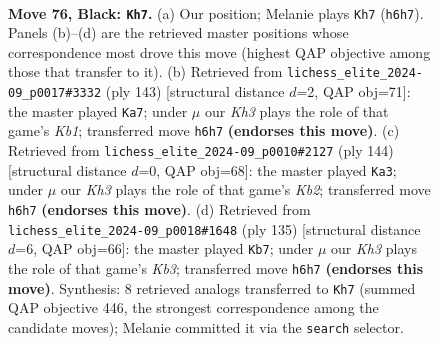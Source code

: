 \documentclass[11pt]{article}
\begin{document}
\clearpage

\begin{figure}[p]\centering
\begin{subfigure}{0.46\textwidth}\centering
\resizebox{\linewidth}{!}{%
\newchessgame
\chessboard[
  setfen={2r5/8/1R5k/8/5K2/8/3r3P/8 b - - 20 76},
  showmover=false,
  pgfstyle=straightmove, color=movearrow, markmove={h6-h7}
]}
\caption{}
\end{subfigure}\hfill
\begin{subfigure}{0.46\textwidth}\centering
\resizebox{\linewidth}{!}{%
\newchessgame
\chessboard[
  setfen={1k5R/8/3K4/P7/8/r7/8/8 b - - 12 72},
  showmover=false,
  pgfstyle=straightmove, color=movearrow, markmove={b8-a7}
]}
\caption{}
\end{subfigure}
\\[4pt]
\begin{subfigure}{0.46\textwidth}\centering
\resizebox{\linewidth}{!}{%
\newchessgame
\chessboard[
  setfen={8/5R2/6R1/8/3k2p1/8/1K5r/8 w - - 6 73},
  showmover=false,
  pgfstyle=straightmove, color=movearrow, markmove={b2-a3}
]}
\caption{}
\end{subfigure}\hfill
\begin{subfigure}{0.46\textwidth}\centering
\resizebox{\linewidth}{!}{%
\newchessgame
\chessboard[
  setfen={8/4K3/1k5R/3P4/8/8/8/2r5 b - - 1 68},
  showmover=false,
  pgfstyle=straightmove, color=movearrow, markmove={b6-b7}
]}
\caption{}
\end{subfigure}
\caption{\textbf{Move 76, Black: \texttt{Kh7}.} (a) Our position; Melanie plays \texttt{Kh7} (\texttt{h6h7}). Panels (b)--(d) are the retrieved master positions whose correspondence most drove this move (highest QAP objective among those that transfer to it). (b) Retrieved from \texttt{lichess\_elite\_2024-09\_p0017\#3332} (ply 143) [structural distance $d$=2, QAP obj=71]: the master played \texttt{Ka7}; under $\mu$ our \emph{Kh3} plays the role of that game's \emph{Kb1}; transferred move \texttt{h6h7} \textbf{(endorses this move)}. (c) Retrieved from \texttt{lichess\_elite\_2024-09\_p0010\#2127} (ply 144) [structural distance $d$=0, QAP obj=68]: the master played \texttt{Ka3}; under $\mu$ our \emph{Kh3} plays the role of that game's \emph{Kb2}; transferred move \texttt{h6h7} \textbf{(endorses this move)}. (d) Retrieved from \texttt{lichess\_elite\_2024-09\_p0018\#1648} (ply 135) [structural distance $d$=6, QAP obj=66]: the master played \texttt{Kb7}; under $\mu$ our \emph{Kh3} plays the role of that game's \emph{Kb3}; transferred move \texttt{h6h7} \textbf{(endorses this move)}. Synthesis: 8 retrieved analogs transferred to \texttt{Kh7} (summed QAP objective 446, the strongest correspondence among the candidate moves); Melanie committed it via the \texttt{search} selector.}
\label{fig:thought-m151}
\end{figure}
\end{document}
